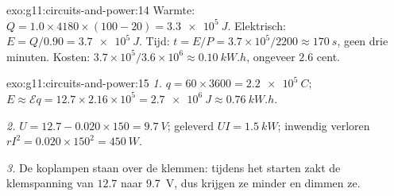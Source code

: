 \begin{solution}{exo:g11:circuits-and-power:14}
Warmte: $Q = 1.0 \times 4180 \times (100 - 20) = \qty{3.3e5}{J}$.
Elektrisch: $E = Q/0.90 = \qty{3.7e5}{J}$. Tijd: $t = E/P =
3.7\times10^{5}/2200 \approx \qty{170}{s}$, geen drie minuten. Kosten:
$3.7\times10^{5}/3.6\times10^{6} \approx \qty{0.10}{kW.h}$, ongeveer
$2.6$ cent.
\end{solution}

\begin{solution}{exo:g11:circuits-and-power:15}
\emph{1.} $q = 60 \times 3600 = \qty{2.2e5}{C}$; $E \approx \mathcal{E}q
= 12.7 \times 2.16\times10^{5} = \qty{2.7e6}{J} \approx \qty{0.76}{kW.h}$.

\emph{2.} $U = 12.7 - 0.020 \times 150 = \qty{9.7}{V}$; geleverd
$UI = \qty{1.5}{kW}$; inwendig verloren $rI^2 = 0.020 \times 150^2 =
\qty{450}{W}$.

\emph{3.} De koplampen staan over de klemmen: tijdens het starten zakt de
klemspanning van $12.7$ naar \qty{9.7}{V}, dus krijgen ze minder 
en dimmen ze.
\end{solution}

